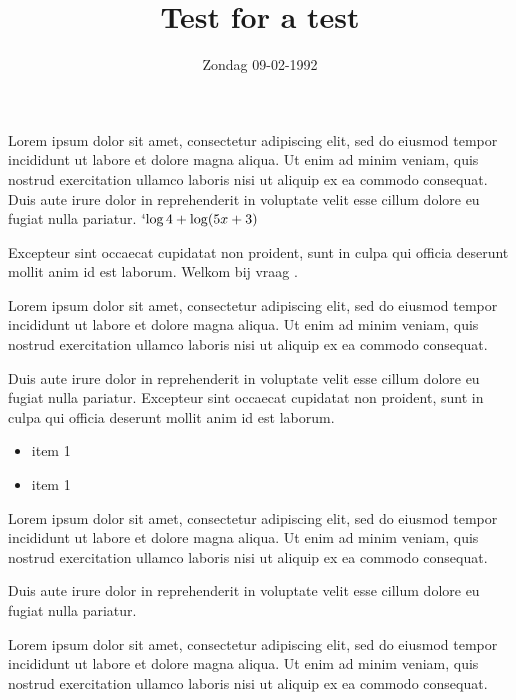 \documentclass[a4paper,12pt]{extarticle}
\title{Test for a test}
\date{Zondag 09-02-1992}
\begin{document}
 \label{exc:lorem}

Lorem ipsum dolor sit amet, consectetur adipiscing elit, sed do eiusmod tempor incididunt ut labore et dolore magna aliqua. Ut enim ad minim veniam, quis nostrud exercitation ullamco laboris nisi ut aliquip ex ea commodo consequat.
Duis aute irure dolor in reprehenderit in voluptate velit esse cillum dolore eu fugiat nulla pariatur. $\lognl[4] 4 + \lognl(5x+3)$

Excepteur sint occaecat cupidatat non proident, sunt in culpa qui officia deserunt mollit anim id est laborum. Welkom bij vraag .\newline

 \label{q:vraag}

Lorem ipsum dolor sit amet, consectetur adipiscing elit, sed do eiusmod tempor incididunt ut labore et dolore magna aliqua. Ut enim ad minim veniam, quis nostrud exercitation ullamco laboris nisi ut aliquip ex ea commodo consequat.\\


Duis aute irure dolor in reprehenderit in voluptate velit esse cillum dolore eu fugiat nulla pariatur. Excepteur sint occaecat cupidatat non proident, sunt in culpa qui officia deserunt mollit anim id est laborum.

 \label{q:vraagvb}
\begin{itemize}
    \item item 1
    \item item 1
\end{itemize}
Lorem ipsum dolor sit amet, consectetur adipiscing elit, sed do eiusmod tempor incididunt ut labore et dolore magna aliqua. Ut enim ad minim veniam, quis nostrud exercitation ullamco laboris nisi ut aliquip ex ea commodo consequat. 

Duis aute irure dolor in reprehenderit in voluptate velit esse cillum dolore eu fugiat nulla pariatur.\newline

Lorem ipsum dolor sit amet, consectetur adipiscing elit, sed do eiusmod tempor incididunt ut labore et dolore magna aliqua. Ut enim ad minim veniam, quis nostrud exercitation ullamco laboris nisi ut aliquip ex ea commodo consequat. 
\end{document}
